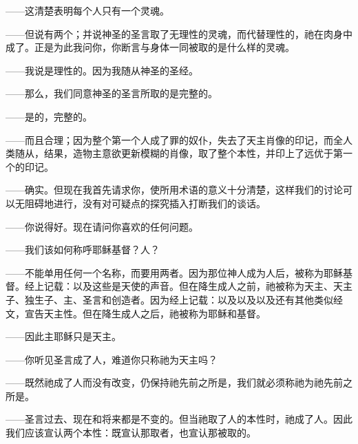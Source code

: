 ——这清楚表明每个人只有一个灵魂。\par

——但说有两个；并说神圣的圣言取了无理性的灵魂，而代替理性的，祂在肉身中成了。正是为此我问你，你断言与身体一同被取的是什么样的灵魂。\par

——我说是理性的。因为我随从神圣的圣经。\par

——那么，我们同意神圣的圣言所取的是完整的。\par

——是的，完整的。\par

——而且合理；因为整个第一个人成了罪的奴仆，失去了天主肖像的印记，而全人类随从，结果，造物主意欲更新模糊的肖像，取了整个本性，并印上了远优于第一个的印记。\par

——确实。但现在我首先请求你，使所用术语的意义十分清楚，这样我们的讨论可以无阻碍地进行，没有对可疑点的探究插入打断我们的谈话。\par

——你说得好。现在请问你喜欢的任何问题。\par

——我们该如何称呼耶稣基督？人？\par

——不能单用任何一个名称，而要用两者。因为那位神人成为人后，被称为耶稣基督。经上记载：以及这些是天使的声音。但在降生成人之前，祂被称为天主、天主子、独生子、主、圣言和创造者。因为经上记载：以及以及以及还有其他类似经文，宣告天主性。但在降生成人之后，祂被称为耶稣和基督。\par

——因此主耶稣只是天主。\par

——你听见圣言成了人，难道你只称祂为天主吗？\par

——既然祂成了人而没有改变，仍保持祂先前之所是，我们就必须称祂为祂先前之所是。\par

——圣言过去、现在和将来都是不变的。但当祂取了人的本性时，祂成了人。因此我们应该宣认两个本性：既宣认那取者，也宣认那被取的。\par

